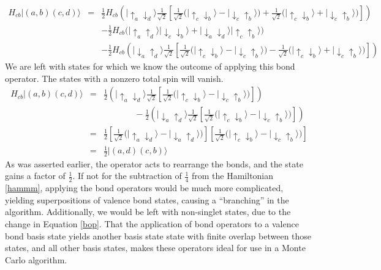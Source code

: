 \begin{eqnarray}
H_{cb}\lvert(a,b)(c,d)\rangle &=&
	     \tfrac{1}{2} H_{cb} \left( \lvert\uparrow_a \downarrow_d \rangle 
	     \tfrac{1}{ \sqrt{2}} \left[ 
	     	\tfrac{1}{ \sqrt{2}} \big(
	     	\lvert \uparrow_c \downarrow_b \rangle - \lvert \downarrow_c \uparrow_b \rangle 
	     \big) + 
	     \tfrac{1}{ \sqrt{2}} \big(
	     \lvert \uparrow_c \downarrow_b \rangle + \lvert \downarrow_c \uparrow_b \rangle 
	     \big)
	     \right]
	     \right) \nonumber \\
	     &&
	     -   \tfrac{1}{2} H_{cb}
	     \Big(\lvert \uparrow_a \uparrow_d \rangle \lvert \downarrow_c \downarrow_b \rangle
	   + \lvert \downarrow_a \downarrow_d \rangle \lvert \uparrow_c \uparrow_b \rangle
	   \Big) \\
	   && - 	     \tfrac{1}{2} H_{cb} \left( \lvert\downarrow_a \uparrow_d \rangle 
	     \tfrac{1}{ \sqrt{2}} \left[ 
	     	\tfrac{1}{ \sqrt{2}} \big(
	     	\lvert \uparrow_c \downarrow_b \rangle - \lvert \downarrow_c \uparrow_b \rangle 
	     \big) -
	     \tfrac{1}{ \sqrt{2}} \big(
	     \lvert \uparrow_c \downarrow_b \rangle + \lvert \downarrow_c \uparrow_b \rangle 
	     \big)
	     \right]
	     \right) \nonumber
\end{eqnarray}
We are left with states for which we know the outcome of applying this bond operator.
The states with a nonzero total spin will vanish.
\begin{eqnarray}
H_{cb}\lvert(a,b)(c,d)\rangle &=&
	     \tfrac{1}{2}\left( \lvert\uparrow_a \downarrow_d \rangle 
	     \tfrac{1}{ \sqrt{2}} \left[ 
	     	\tfrac{1}{ \sqrt{2}} \big(
	     	\lvert \uparrow_c \downarrow_b \rangle - \lvert \downarrow_c \uparrow_b \rangle 
	     \big)
	     \right]
	     \right) \nonumber \\    
	   && \;\; \;\;\;\;\;\; \;\;\;\;\;
	    - 	     \tfrac{1}{2} \left( \lvert\downarrow_a \uparrow_d \rangle 
	     \tfrac{1}{ \sqrt{2}} \left[ 
	     	\tfrac{1}{ \sqrt{2}} \big(
	     	\lvert \uparrow_c \downarrow_b \rangle - \lvert \downarrow_c \uparrow_b \rangle 
	     \big)
	     \right]
	     \right) \nonumber \\
	     &=&  \tfrac{1}{2} \left[ \tfrac{1}{ \sqrt{2}} 
	     \big( \lvert\uparrow_a \downarrow_d \rangle - \lvert\downarrow_a \uparrow_d \rangle  
	     \big)\right]
	     \left[ \tfrac{1}{ \sqrt{2}} 
	     \big( \lvert\uparrow_c \downarrow_b \rangle - \lvert\downarrow_c \uparrow_b \rangle  
	     \big)\right] \\
	     &=& \tfrac{1}{2} \lvert(a,d)(c,b)\rangle \nonumber
\end{eqnarray}
As was asserted earlier, the operator acts to rearrange the bonds, and the state gains a factor of $\frac{1}{2}$.  
If not for the subtraction of $\frac{1}{4}$ from the Hamiltonian \eqref{hammm}, applying the bond operators would be much more complicated, yielding superpositions of valence bond states, causing a ``branching'' in the algorithm.  Additionally, we would be left with non-singlet states, due to the change in Equation \eqref{bop}.
That the application of bond operators to a valence bond basis state yields another basis state state with finite overlap between those states, and all other basis states, makes these operators ideal for use in a  Monte Carlo algorithm.

